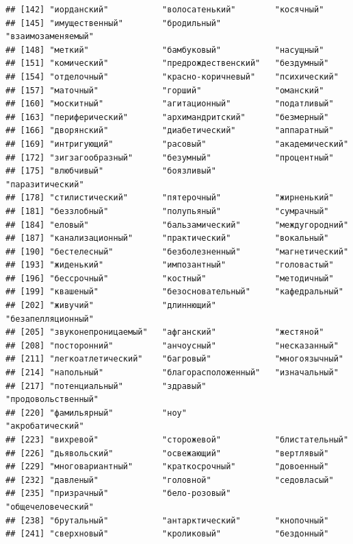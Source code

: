 \documentclass[11pt]{article}\usepackage[]{graphicx}\usepackage[]{color}
\makeatletter
\newenvironment{kframe}{%
 \def\at@end@of@kframe{}%
 \ifinner\ifhmode%
  \def\at@end@of@kframe{\end{minipage}}%
  \begin{minipage}{\columnwidth}%
 \fi\fi%
 \def\FrameCommand##1{\hskip\@totalleftmargin \hskip-\fboxsep
 \colorbox{shadecolor}{##1}\hskip-\fboxsep
     \hskip-\linewidth \hskip-\@totalleftmargin \hskip\columnwidth}%
 \MakeFramed {\advance\hsize-\width
   \@totalleftmargin\z@ \linewidth\hsize
   \@setminipage}}%
 {\par\unskip\endMakeFramed%
 \at@end@of@kframe}
\newenvironment{knitrout}{}{} %
\makeatother
\begin{document}
\begin{knitrout}
\begin{kframe}
\begin{verbatim}
## [142] "иорданский"           "волосатенький"        "косячный"            
## [145] "имущественный"        "бродильный"           "взаимозаменяемый"    
## [148] "меткий"               "бамбуковый"           "насущный"            
## [151] "комический"           "предрождественский"   "бездумный"           
## [154] "отделочный"           "красно-коричневый"    "психический"         
## [157] "маточный"             "горший"               "оманский"            
## [160] "москитный"            "агитационный"         "податливый"          
## [163] "периферический"       "архимандритский"      "безмерный"           
## [166] "дворянский"           "диабетический"        "аппаратный"          
## [169] "интригующий"          "расовый"              "академический"       
## [172] "зигзагообразный"      "безумный"             "процентный"          
## [175] "влюбчивый"            "боязливый"            "паразитический"      
## [178] "стилистический"       "пятерочный"           "жирненький"          
## [181] "беззлобный"           "полупьяный"           "сумрачный"           
## [184] "еловый"               "бальзамический"       "междугородний"       
## [187] "канализационный"      "практический"         "вокальный"           
## [190] "бестелесный"          "безболезненный"       "магнетический"       
## [193] "жиденький"            "импозантный"          "головастый"          
## [196] "бессрочный"           "костный"              "методичный"          
## [199] "квашеный"             "безосновательный"     "кафедральный"        
## [202] "живучий"              "длиннющий"            "безапелляционный"    
## [205] "звуконепроницаемый"   "афганский"            "жестяной"            
## [208] "посторонний"          "анчоусный"            "несказанный"         
## [211] "легкоатлетический"    "багровый"             "многоязычный"        
## [214] "напольный"            "благорасположенный"   "изначальный"         
## [217] "потенциальный"        "здравый"              "продовольственный"   
## [220] "фамильярный"          "ноу"                  "акробатический"      
## [223] "вихревой"             "сторожевой"           "блистательный"       
## [226] "дьявольский"          "освежающий"           "вертлявый"           
## [229] "многовариантный"      "краткосрочный"        "довоенный"           
## [232] "давленый"             "головной"             "седовласый"          
## [235] "призрачный"           "бело-розовый"         "общечеловеческий"    
## [238] "брутальный"           "антарктический"       "кнопочный"           
## [241] "сверхновый"           "кроликовый"           "бездонный"           

\end{verbatim}
\end{kframe}
\end{knitrout}
\end{document}
